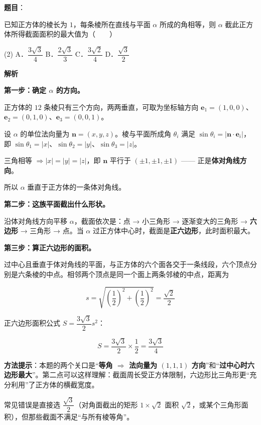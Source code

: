 \begin{answer}

\textbf{题目}：

已知正方体的棱长为 $1$，每条棱所在直线与平面 $\alpha$ 所成的角相等，则 $\alpha$ 截此正方体所得截面面积的最大值为\mbox{（　　）}

\begin{gkopts}(2)
\task A．$\dfrac{3\sqrt3}4$
\task B．$\dfrac{2\sqrt3}3$
\task C．$\dfrac{3\sqrt2}4$
\task D．$\dfrac{\sqrt3}2$
\end{gkopts}

\textbf{解析}

\textbf{第一步：确定 $\alpha$ 的方向。}

正方体的 $12$ 条棱只有三个方向，两两垂直，可取为坐标轴方向 $\boldsymbol e_1=(1,0,0)$、$\boldsymbol e_2=(0,1,0)$、$\boldsymbol e_3=(0,0,1)$。

设 $\alpha$ 的单位法向量为 $\boldsymbol n=(x,y,z)$。棱与平面所成角 $\theta_i$ 满足 $\sin\theta_i=\left|\boldsymbol n\cdot\boldsymbol e_i\right|$，即 $\sin\theta_1=|x|$、$\sin\theta_2=|y|$、$\sin\theta_3=|z|$。

三角相等 $\Rightarrow|x|=|y|=|z|$，即 $\boldsymbol n$ 平行于 $(\pm1,\pm1,\pm1)$ —— 正是\textbf{体对角线方向}。

所以 $\alpha$ 垂直于正方体的一条体对角线。

\textbf{第二步：这族平面截出什么形状。}

沿体对角线方向平移 $\alpha$，截面依次是：点 → 小三角形 → 逐渐变大的三角形 → \textbf{六边形} → 三角形 → 点。当 $\alpha$ 过正方体中心时，截面是\textbf{正六边形}，此时面积最大。

\textbf{第三步：算正六边形的面积。}

过中心且垂直于体对角线的平面，与正方体的六个面各交于一条线段，六个顶点分别是六条棱的中点。相邻两个顶点是同一个面上两条邻棱的中点，距离为

\nopagebreak[4]
\[s=\sqrt{\left(\frac12\right)^{2}+\left(\frac12\right)^{2}}=\frac{\sqrt2}2\]

正六边形面积公式 $S=\dfrac{3\sqrt3}2s^{2}$：

\nopagebreak[4]
\[S=\frac{3\sqrt3}2\times\frac12=\frac{3\sqrt3}4\]

\begin{gktip}
\textbf{方法提示}：本题的两个关口是“\textbf{等角 $\Rightarrow$ 法向量为 $(1,1,1)$ 方向}”和“\textbf{过中心时六边形最大}”。第二点可以这样理解：截面周长受正方体限制，六边形比三角形更“充分利用”了正方体的横截宽度。

常见错误是直接选 $\dfrac{\sqrt3}2$（对角面截出的矩形 $1\times\sqrt2$ 面积 $\sqrt2$，或某个三角形面积），但那些截面不满足“与所有棱等角”。
\end{gktip}


\par\medskip

\end{answer}

